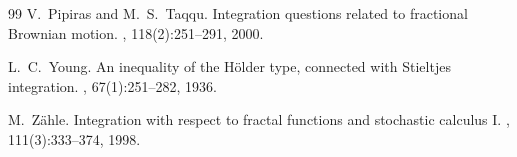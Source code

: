 \documentclass[11pt,a4paper]{article}
\theoremstyle{plain}
\theoremstyle{definition}
\theoremstyle{remark}
\begin{document}
\begin{thebibliography}{99}
V.~Pipiras and M.~S.~Taqqu.
\newblock Integration questions related to fractional {B}rownian motion.
, 118(2):251--291, 2000.

L.~C.~Young.
\newblock An inequality of the {H}\"older type, connected with {S}tieltjes integration.
, 67(1):251--282, 1936.

M.~Z\"ahle.
\newblock Integration with respect to fractal functions and stochastic calculus {I}.
, 111(3):333--374, 1998.

\end{thebibliography}
\end{document}
